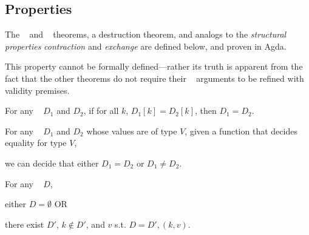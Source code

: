 \subsection{Properties}
\label{sec:DD:props}

The \SemInj~ and \EqDec~ theorems, a destruction theorem, and analogs to the \emph{structural properties} \emph{contraction} and \emph{exchange} are defined below, and proven in Agda.


\begin{remark}[\SemTot]
%
\textnormal{This property cannot be formally defined---rather its truth is apparent from the fact that the other theorems do not require their \dd~ arguments to be refined with validity premises.}
%
\end{remark}

\begin{theorem}[\SemInj]
\label{thm:SemInj}

\breakAndIndent
%
For any \dds~ $D_1$ and $D_2$,
%
if for all $k$, $D_1[k] = D_2[k]$,
%
then $D_1 = D_2$.

\end{theorem}

\begin{theorem}[\EqDec]
\label{thm:EqDec}

\breakAndIndent
%
For any \dds~ $D_1$ and $D_2$ whose values are of type $V$,
%
given a function that decides equality for type $V$,
%

\justIndent
%
we can decide that either $D_1 = D_2$ or $D_1 \ne D_2$.

\end{theorem}

\begin{theorem}
\label{thm:EzDstr}

\breakAndIndent
%
For any \dd~ $D$,

\justIndent \quad
%
either $D = \emptyset$ OR

\justIndent \quad
%
there exist $D'$, $k \notin D'$, and $v$
%
s.t. $D = D' , (k, v)$.

\end{theorem}



